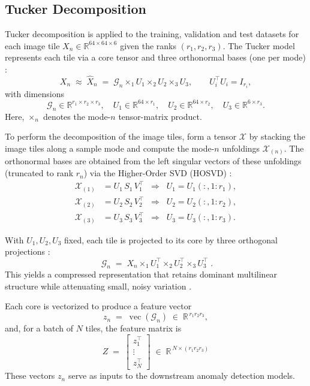 \documentclass[pdflatex,sn-mathphys-ay]{sn-jnl}
\begin{document}
\subsection{Tucker Decomposition}

Tucker decomposition is applied to the training, validation and test datasets for each image tile \(X_n \in \mathbb{R}^{64\times 64\times 6}\) given the ranks \((r_1,r_2,r_3)\).
The Tucker model represents each tile via a core tensor and three orthonormal bases (one per mode)
\citep{Tucker1966,KoldaBader2009}:
\[
X_n \;\approx\; \hat X_n \;=\; \mathcal{G}_n \times_{1} U_1 \times_{2} U_2 \times_{3} U_3,
\qquad U_i^\top U_i = I_{r_i},
\]
with dimensions
\[
\mathcal{G}_n \in \mathbb{R}^{r_1\times r_2\times r_3},\quad
U_1 \in \mathbb{R}^{64\times r_1},\quad
U_2 \in \mathbb{R}^{64\times r_2},\quad
U_3 \in \mathbb{R}^{6\times r_3}.
\]
Here, \(\times_n\) denotes the mode-\(n\) tensor-matrix product.

\noindent To perform the decomposition of the image tiles, form a tensor \(\mathcal{X}\) by stacking the image tiles along a sample mode and compute the mode-\(n\) unfoldings \(\mathcal{X}_{(n)}\).
The orthonormal bases are obtained from the left singular vectors of these unfoldings (truncated to rank \(r_n\)) via the
Higher-Order SVD (HOSVD) \citep{DeLathauwer2000a}:
\[
\begin{aligned}
\mathcal{X}_{(1)} &= U_1\,S_1\,V_1^\top \;\;\Rightarrow\;\; U_1 = U_1(:,1{:}r_1),\\[4pt]
\mathcal{X}_{(2)} &= U_2\,S_2\,V_2^\top \;\;\Rightarrow\;\; U_2 = U_2(:,1{:}r_2),\\[4pt]
\mathcal{X}_{(3)} &= U_3\,S_3\,V_3^\top \;\;\Rightarrow\;\; U_3 = U_3(:,1{:}r_3).
\end{aligned}
\]

\noindent With \(U_1,U_2,U_3\) fixed, each tile is projected to its core by three orthogonal projections
\citep{KoldaBader2009}:
\[
\boxed{\;\mathcal{G}_n \;=\; X_n \times_{1} U_1^{\top} \times_{2} U_2^{\top} \times_{3} U_3^{\top}\; }.
\]
This yields a compressed representation that retains dominant multilinear structure while attenuating small, noisy variation
\citep{KoldaBader2009}.

\noindent Each core is vectorized to produce a feature vector
\[
z_n \;=\; \operatorname{vec}(\mathcal{G}_n) \;\in\; \mathbb{R}^{\,r_1 r_2 r_3},
\]
and, for a batch of \(N\) tiles, the feature matrix is
\[
Z \;=\; \begin{bmatrix} z_1^\top \\ \vdots \\ z_N^\top \end{bmatrix}
\;\in\; \mathbb{R}^{\,N \times (r_1 r_2 r_3)}
\]
These vectors \(z_n\) serve as inputs to the downstream anomaly detection models.
\end{document}
